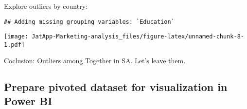 \documentclass[]{article}
\newenvironment{Shaded}{\begin{snugshade}}{\end{snugshade}}
\newcommand{\CommentTok}[1]{\textcolor[rgb]{0.56,0.35,0.01}{\textit{#1}}}
\newcommand{\DataTypeTok}[1]{\textcolor[rgb]{0.13,0.29,0.53}{#1}}
\newcommand{\KeywordTok}[1]{\textcolor[rgb]{0.13,0.29,0.53}{\textbf{#1}}}
\newcommand{\NormalTok}[1]{#1}
\newcommand{\OperatorTok}[1]{\textcolor[rgb]{0.81,0.36,0.00}{\textbf{#1}}}
\newcommand{\StringTok}[1]{\textcolor[rgb]{0.31,0.60,0.02}{#1}}
\begin{document}
Explore outliers by country:

\begin{Shaded}
\end{Shaded}

\begin{verbatim}
## Adding missing grouping variables: `Education`
\end{verbatim}

\texttt{[image: JatApp-Marketing-analysis\_files/figure-latex/unnamed-chunk-8-1.pdf]}

Coclusion: Outliers among Together in SA. Let's leave them.

\hypertarget{prepare-pivoted-dataset-for-visualization-in-power-bi}{%
\subsection{Prepare pivoted dataset for visualization in Power
BI}\label{prepare-pivoted-dataset-for-visualization-in-power-bi}}
\end{document}
